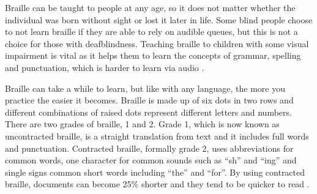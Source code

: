 Braille can be taught to people at any age, so it does not matter whether the individual was born without sight or lost it later in life.
Some blind people choose to not learn braille if they are able to rely on audible queues, but this is not a choice for those with deafblindness.
Teaching braille to children with some visual impairment is vital as it helps them to learn the concepts of grammar, spelling and punctuation, which is harder to learn via audio \cite{sight_scotland_what_nodate}.  

Braille can take a while to learn, but like with any language, the more you practice the easier it becomes.
Braille is made up of six dots in two rows and different combinations of raised dots represent different letters and numbers.
There are two grades of braille, 1 and 2. Grade 1, which is now known as uncontracted braille, is a straight translation from text and it includes full words and punctuation.
Contracted braille, formally grade 2, uses abbreviations for common words, one character for common sounds such as ``sh'' and ``ing'' and single signs common short words including ``the'' and ``for''.
By using contracted braille, documents can become 25\% shorter and they tend to be quicker to read \cite{royal_national_institute_of_blind_people_braille_nodate,sense_braille_nodate}.  